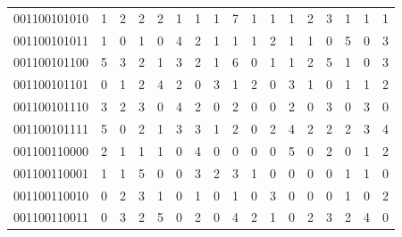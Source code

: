 \documentclass[10pt,a4paper]{article}
\begin{document}
\begin{longtable}{ |c|c|c|c|c|c|c|c|c|c|c|c|c|c|c|c|c| }
    001100101010              & 1                            & 2                                & 2                            & 2                              & 1   & 1   & 1   & 7   & 1   & 1   & 1   & 2   & 3   & 1   & 1   & 1   \\
    001100101011              & 1                            & 0                                & 1                            & 0                              & 4   & 2   & 1   & 1   & 1   & 2   & 1   & 1   & 0   & 5   & 0   & 3   \\
    001100101100              & 5                            & 3                                & 2                            & 1                              & 3   & 2   & 1   & 6   & 0   & 1   & 1   & 2   & 5   & 1   & 0   & 3   \\
    001100101101              & 0                            & 1                                & 2                            & 4                              & 2   & 0   & 3   & 1   & 2   & 0   & 3   & 1   & 0   & 1   & 1   & 2   \\
    001100101110              & 3                            & 2                                & 3                            & 0                              & 4   & 2   & 0   & 2   & 0   & 0   & 2   & 0   & 3   & 0   & 3   & 0   \\
    001100101111              & 5                            & 0                                & 2                            & 1                              & 3   & 3   & 1   & 2   & 0   & 2   & 4   & 2   & 2   & 2   & 3   & 4   \\
    001100110000              & 2                            & 1                                & 1                            & 1                              & 0   & 4   & 0   & 0   & 0   & 0   & 5   & 0   & 2   & 0   & 1   & 2   \\
    001100110001              & 1                            & 1                                & 5                            & 0                              & 0   & 3   & 2   & 3   & 1   & 0   & 0   & 0   & 0   & 1   & 1   & 0   \\
    001100110010              & 0                            & 2                                & 3                            & 1                              & 0   & 1   & 0   & 1   & 0   & 3   & 0   & 0   & 0   & 1   & 0   & 2   \\
    001100110011              & 0                            & 3                                & 2                            & 5                              & 0   & 2   & 0   & 4   & 2   & 1   & 0   & 2   & 3   & 2   & 4   & 0   \\

\end{longtable}
\end{document}
